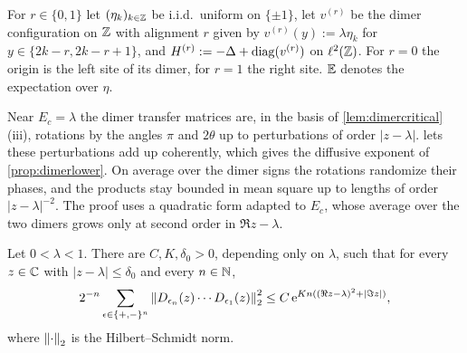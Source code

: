 For $r\in\{0,1\}$ let $(\eta_k)_{k\in\mathbb{Z}}$ be i.i.d.\ uniform on $\{\pm1\}$, let $v^{(r)}$ be the dimer
configuration on $\mathbb{Z}$ with alignment $r$ given by $v^{(r)}(y):=\lambda\eta_k$ for $y\in\{2k-r,2k-r+1\}$,
and $H^{(r)}:=-\Delta+\operatorname{diag}(v^{(r)})$ on $\ell^2(\mathbb{Z})$.  For $r=0$ the origin is the left site of its
dimer, for $r=1$ the right site.  $\mathbb{E}$ denotes the expectation over $\eta$.

Near $E_c=\lambda$ the dimer transfer matrices are, in the basis of \cref{lem:dimercritical}(iii), rotations by the
angles $\pi$ and $2\theta$ up to perturbations of order $|z-\lambda|$.   lets these perturbations
add up coherently, which gives the diffusive exponent of \cref{prop:dimerlower}.  On average over the dimer signs the
rotations randomize their phases, and the products stay bounded in mean square up to lengths of order $|z-\lambda|^{-2}$.
The proof uses a quadratic form adapted to $E_c$, whose average over the two dimers grows only at second order in
$\Re z-\lambda$.

\begin{lemma}\label{lem:dimersecond}
Let $0<\lambda<1$.  There are $C,K,\delta_0>0$, depending only on $\lambda$, such that for every $z\in\mathbb{C}$ with
$|z-\lambda|\le\delta_0$ and every $n\in\mathbb{N}$,
\[
  2^{-n}\sum_{\epsilon\in\{+,-\}^n}\left\|D_{\epsilon_n}(z)\cdots D_{\epsilon_1}(z)\right\|_2^2\le C\,\mathrm{e}^{Kn((\Re z-\lambda)^2+|\Im z|)},
\]
where $\left\|\cdot\right\|_2$ is the Hilbert--Schmidt norm.
\end{lemma}


